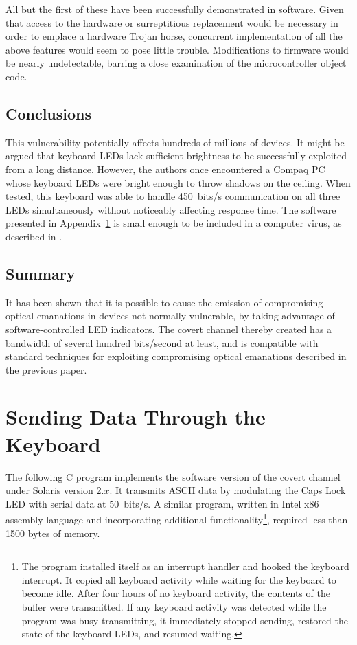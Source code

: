 \documentclass{acmtrans2e}
\begin{document}
All but the first of these have been successfully demonstrated in
software.  Given that access to the hardware or surreptitious replacement
would be necessary in order to emplace a hardware Trojan horse, concurrent 
implementation of all the above features would seem to pose little trouble.  
Modifications to firmware would be nearly undetectable, barring a close 
examination of the microcontroller object code.

\subsection{Conclusions}

This vulnerability potentially affects hundreds of millions of devices.
It might be argued that keyboard LEDs lack sufficient brightness to be 
successfully exploited from a long distance.  However, the authors once 
encountered a Compaq PC whose keyboard LEDs were bright enough to throw 
shadows on the ceiling.  When tested, this keyboard was able to handle 
450~bits/s communication on all three LEDs simultaneously without 
noticeably affecting response time.  The software presented in
Appendix~\ref{appendix:code} is small enough to be included in a computer
virus, as described in \cite{information_hiding}.

\subsection{Summary}

It has been shown that it is possible to cause the emission of 
compromising optical emanations in devices not normally vulnerable, 
by taking advantage of software-controlled LED indicators.
The covert channel thereby 
created has a bandwidth of several hundred bits/second at least, and is 
compatible with standard techniques for exploiting compromising optical 
emanations described in the previous paper.

\section{Sending Data Through the Keyboard}\label{appendix:code}

The following C program implements the software version of the covert
channel under 
Solaris version 2.$x$.  It transmits ASCII data by modulating the Caps Lock LED
with serial data at 50~bits/s.  A similar program, written in Intel
x86 assembly language and incorporating additional 
functionality\footnote{The program installed itself as an interrupt 
handler and hooked the keyboard interrupt.  It copied all keyboard 
activity while waiting for the keyboard to become idle.  After four 
hours of no keyboard activity, the contents of the buffer were
transmitted.  If any keyboard activity was detected while the program
was busy transmitting, it immediately stopped sending, restored the
state of the keyboard LEDs, and resumed waiting.}, required less than
1500 bytes of memory.
\end{document}
